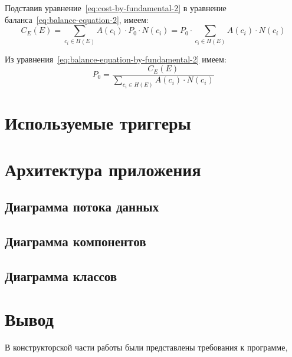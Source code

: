 Подставив уравнение~\ref{eq:cost-by-fundamental-2} в уравнение баланса~\ref{eq:balance-equation-2}, имеем:
\begin{equation}
	C_E(E) = \sum_{c_i \in H(E)}{A(c_i) \cdot P_0 \cdot N(c_i)} = P_0 \cdot \sum_{c_i \in H(E)}{A(c_i) \cdot N(c_i)}
	\label{eq:balance-equation-by-fundamental-2}
\end{equation}

Из уравнения~\ref{eq:balance-equation-by-fundamental-2} имеем:
\begin{equation}
	P_0 = \frac{C_E(E)}{\sum_{c_i \in H(E)}{A(c_i) \cdot N(c_i)}}
	\label{eq:fundamental-price-2}
\end{equation}

\section{Используемые триггеры}

\section{Архитектура приложения}

\subsection{Диаграмма потока данных}

\subsection{Диаграмма компонентов}

\subsection{Диаграмма классов}


\section{Вывод}

В конструкторской части работы были представлены требования к программе, 

\clearpage
